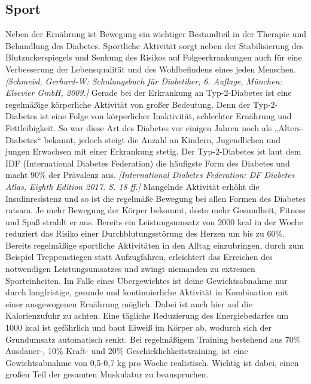 \documentclass[a4paper,11pt]{article}%
\renewcommand{\\}{\vspace*{0.5\baselineskip} \newline}
\begin{document}
\subsection{Sport}
	Neben der Ernährung ist Bewegung ein wichtiger Bestandteil in der Therapie und Behandlung des Diabetes. Sportliche Aktivität sorgt neben der Stabilisierung des Blutzuckerspiegels und Senkung des Risikos auf Folgeerkrankungen auch für eine Verbesserung der Lebensqualität und des Wohlbefindens eines jeden Menschen. \emph{[Schmeisl, Gerhard-W: Schulungsbuch für Diabetiker, 6. Auflage, München: Elsevier GmbH, 2009.]}\\
	Gerade bei der Erkrankung an Typ-2-Diabetes ist eine regelmäßige körperliche Aktivität von großer Bedeutung. Denn der Typ-2-Diabetes ist eine Folge von körperlicher Inaktivität, schlechter Ernährung und Fettleibigkeit. So war diese Art des Diabetes vor einigen Jahren noch als „Alters-Diabetes“ bekannt, jedoch steigt die Anzahl an Kindern, Jugendlichen und jungen Erwachsen mit einer Erkrankung stetig. Der Typ-2-Diabetes ist laut dem IDF (International Diabetes Federation) die häufigste Form des Diabetes und macht 90\% der Prävalenz aus. \emph{[International Diabetes Federation: DF Diabetes Atlas, Eighth Edition 2017. S. 18 ff.]}\newline
	Mangelnde Aktivität erhöht die Insulinresistenz und so ist die regelmäße Bewegung bei allen Formen des Diabetes ratsam. Je mehr Bewegung der Körper bekommt, desto mehr Gesundheit, Fitness und Spaß strahlt er aus. Bereits ein Leistungsumsatz von 2000 kcal in der Woche reduziert das Risiko einer Durchblutungsstörung des Herzen um bis zu 60\%. Bereits regelmäßige sportliche Aktivitäten in den Alltag einzubringen, durch zum Beispiel Treppenstiegen statt Aufzugfahren, erleichtert das Erreichen des notwendigen Leistungsumsatzes und zwingt niemanden zu extremen Sporteinheiten. \newline
	Im Falle eines Übergewichtes ist deine Gewichtsabnahme nur durch langfristige, gesunde und kontinuierliche Aktivität in Kombination mit einer ausgewogenen Ernährung möglich. Dabei ist auch hier auf die Kalorienzufuhr zu achten. Eine tägliche Reduzierung des Energiebedarfes um 1000 kcal ist gefährlich und baut Eiweiß im Körper ab, wodurch sich der Grundumsatz automatisch senkt. Bei regelmäßigem Training bestehend aus 70\% Ausdauer-, 10\% Kraft- und 20\% Geschicklichkeitstraining, ist eine Gewichtsabnahme von 0,5-0,7 kg pro Woche realistisch. Wichtig ist dabei, einen großen Teil der gesamten Muskulatur zu beanspruchen.\newline
\end{document}
